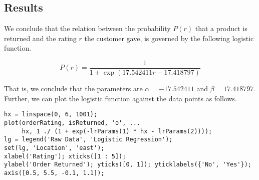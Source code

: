 \subsection{Results}

We conclude that the relation between the probability $P(r)$ that a product is  returned and the rating $r$ the customer gave, is governed by the following logistic function.

$$P(r) = \frac{1}{1 + \exp(17.542411 r - 17.418797)}$$

\noindent
That is, we conclude that the parameters are $\alpha = -17.542411$ and $\beta = 17.418797$. Further, we can plot the logistic function against the data points as follows.

\begin{lstlisting}
hx = linspace(0, 6, 1001);
plot(orderRating, isReturned, 'o', ...
     hx, 1 ./ (1 + exp(-lrParams(1) * hx - lrParams(2))));
lg = legend('Raw Data', 'Logistic Regression');
set(lg, 'Location', 'east');
xlabel('Rating'); xticks([1 : 5]);
ylabel('Order Returned'); yticks([0, 1]); yticklabels({'No', 'Yes'});
axis([0.5, 5.5, -0.1, 1.1]);
\end{lstlisting}


